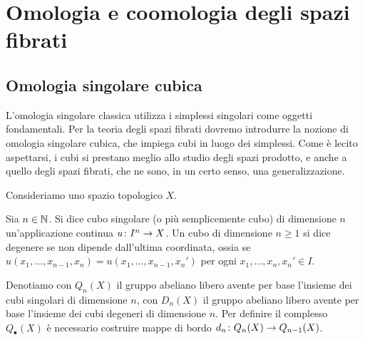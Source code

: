 \chapter{Omologia e coomologia degli spazi fibrati}

\section{Omologia singolare cubica}

L'omologia singolare classica utilizza i simplessi singolari come oggetti fondamentali. Per la teoria degli spazi fibrati dovremo introdurre la nozione di omologia singolare cubica, che impiega cubi in luogo dei simplessi. Come è lecito aspettarsi, i cubi si prestano meglio allo studio degli spazi prodotto, e anche a quello degli spazi fibrati, che ne sono, in un certo senso, una generalizzazione.

Consideriamo uno spazio topologico $X$.

\begin{definition}
Sia $n\in\mathbb{N}$. Si dice cubo singolare (o più semplicemente cubo) di dimensione $n$ un'applicazione continua $u\colon I^n\to X$. Un cubo di dimensione $n\ge 1$ si dice degenere se non dipende dall'ultima coordinata, ossia se $u(x_1,\ldots,x_{n-1},x_n)=u(x_1,\ldots,x_{n-1},x_n')$ per ogni $x_1,\ldots,x_n,x_n'\in I$.
\end{definition}

Denotiamo con $Q_n(X)$ il gruppo abeliano libero avente per base l'insieme dei cubi singolari di dimensione $n$, con $D_n(X)$ il gruppo abeliano libero avente per base l'insieme dei cubi degeneri di dimensione $n$. Per definire il complesso $Q_\bullet(X)$ è necessario costruire mappe di bordo $d_n\colon Q_n(X)\to Q_{n-1}(X)$.

